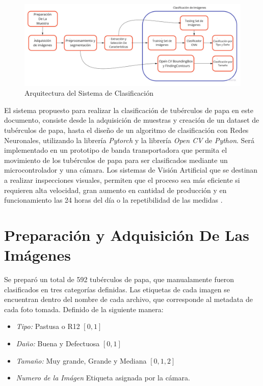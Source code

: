 \begin{figure}[ht]
	\centering
	\includegraphics[scale=0.3]{Figs/FGGeneral.jpg}
	\caption{Arquitectura del Sistema de Clasificación}
	\label{fig:flujogeneral}
\end{figure}

El sistema propuesto para realizar la clasificación de tubérculos de papa en este documento, consiste desde la adquisición de muestras y creación de un dataset de tubérculos de papa, hasta el diseño de un algoritmo de clasificación con Redes Neuronales, utilizando la librería \textit{Pytorch} y la librería \textit{Open CV} de \textit{Python}. Será implementado en un prototipo de banda transportadora que permita el movimiento de los tubérculos de papa para ser clasificados mediante un microcontrolador y una cámara. Los sistemas de Visión Artificial que se destinan a realizar inspecciones visuales, permiten que el proceso sea más eficiente si requieren alta velocidad, gran aumento en cantidad de producción y en funcionamiento las 24 horas del día o la repetibilidad de las medidas \cite{artificial2012aplicacion}.


\section{Preparación y Adquisición De Las Imágenes}

	Se preparó un total de 592 tubérculos de papa, que manualamente fueron clasificados en tres categorías definidas. Las etiquetas de cada imagen se encuentran dentro del nombre de cada archivo, que corresponde al metadata de cada foto tomada. Definido de la siguiente manera:
	
	\begin{itemize}
		\item \textit{Tipo:} Pastusa o R12 $[0,1]$
		\item \textit{Daño:} Buena y Defectuosa $[0,1]$
		\item \textit{Tamaño:} Muy grande, Grande y Mediana $[0,1,2]$
		\item \textit{Numero de la Imágen} Etiqueta asignada por la cámara.
	\end{itemize}	
	
